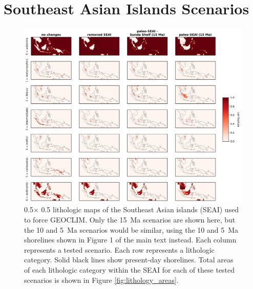 \documentclass[11pt,letterpaper]{article}
\newcommand{\degrees}{\textdegree\xspace}
\begin{document}
\section*{Southeast Asian Islands Scenarios}

\begin{figure}[h!]
    \centering
    \includegraphics[width=1\textwidth]{Figures/SEAI_fracs.jpg}
    \caption{0.5\degrees $\times$ 0.5\degrees lithologic maps of the Southeast Asian islands (SEAI) used to force GEOCLIM. Only the 15~Ma scenarios are shown here, but the 10 and 5~Ma scenarios would be similar, using the 10 and 5~Ma shorelines shown in Figure 1 of the main text instead. Each column represents a tested scenario. Each row represents a lithologic category. Solid black lines show present-day shorelines. Total areas of each lithologic category within the SEAI for each of these tested scenarios is shown in Figure \ref{fig:lithology_areas}.}
    \label{fig:SEAI_fracs}
\end{figure}
\end{document}
